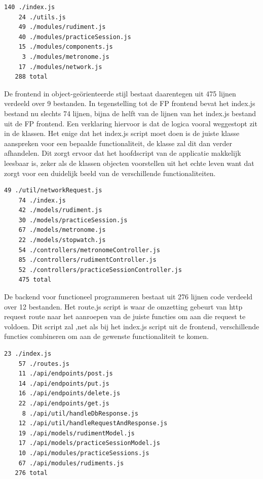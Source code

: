  \begin{lstlisting}[caption=FP frontend aantal code]
    140 ./index.js
    24 ./utils.js
    49 ./modules/rudiment.js
    40 ./modules/practiceSession.js
    15 ./modules/components.js
     3 ./modules/metronome.js
    17 ./modules/network.js
   288 total
 \end{lstlisting}

De frontend in object-geörienteerde stijl bestaat daarentegen uit 475 lijnen verdeeld over 9 bestanden. In tegenstelling tot de FP frontend bevat het index.js bestand nu slechts 74 lijnen, bijna de helft van de lijnen van het index.js bestand uit de FP frontend. Een verklaring hiervoor is dat de logica vooral weggestopt zit in de klassen. Het enige dat het index.js script moet doen is de juiste klasse aanspreken voor een bepaalde functionaliteit, de klasse zal dit dan verder afhandelen. Dit zorgt ervoor dat het hoofdscript van de applicatie makkelijk leesbaar is, zeker als de klassen objecten voorstellen uit het echte leven want dat zorgt voor een duidelijk beeld van de verschillende functionaliteiten.

 \begin{lstlisting}[caption=OOP frontend aantal code]
    49 ./util/networkRequest.js
    74 ./index.js
    42 ./models/rudiment.js
    30 ./models/practiceSession.js
    67 ./models/metronome.js
    22 ./models/stopwatch.js
    54 ./controllers/metronomeController.js
    85 ./controllers/rudimentController.js
    52 ./controllers/practiceSessionController.js
    475 total
 \end{lstlisting}

 De backend voor functioneel programmeren bestaat uit 276 lijnen code verdeeld over 12 bestanden. Het route.js script is waar de omzetting gebeurt van http request route naar het aanroepen van de juiste functies om aan die request te voldoen. Dit script zal ,net als bij het index.js script uit de frontend, verschillende functies combineren om aan de gewenste functionaliteit te komen.

 \begin{lstlisting}[caption=FP backend aantal code]
    23 ./index.js
    57 ./routes.js
    11 ./api/endpoints/post.js
    14 ./api/endpoints/put.js
    16 ./api/endpoints/delete.js
    22 ./api/endpoints/get.js
     8 ./api/util/handleDbResponse.js
    12 ./api/util/handleRequestAndResponse.js
    19 ./api/models/rudimentModel.js
    17 ./api/models/practiceSessionModel.js
    10 ./api/modules/practiceSessions.js
    67 ./api/modules/rudiments.js
   276 total 
\end{lstlisting}

